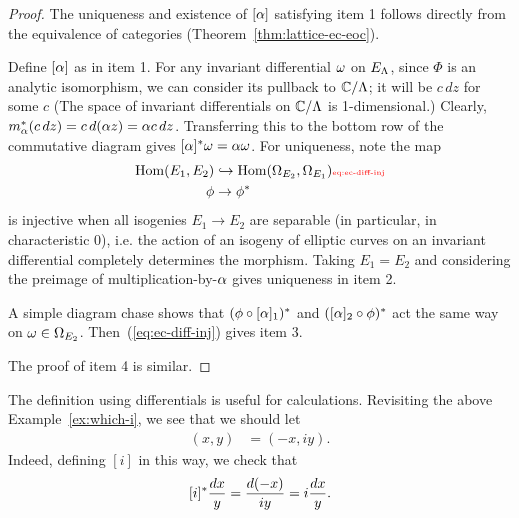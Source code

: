 \begin{proof}
The uniqueness and existence of $[\alpha]$ satisfying item 1 follows directly from the equivalence of categories (Theorem~\ref{thm:lattice-ec-eoc}).

Define $[\alpha]$ as in item 1.
For any invariant differential $\omega$ on $E_{\Lambda}$, since $\Phi$ is an analytic isomorphism, we can consider its pullback to $\mathbb{C}/\Lambda$; it will be $c\,dz$ for some $c$ (The space of invariant differentials on $\mathbb{C}/\Lambda$ is 1-dimensional.) Clearly, $m_{\alpha}^*(c\,dz)=c\,d(\alpha z)=\alpha c\,dz$. Transferring this to the bottom row of the commutative diagram gives $[\alpha]^*\omega=\alpha\omega$. 
For uniqueness, note the map
\begin{align}
\Hom(E_1,E_2)&\hra \Hom(\Om_{E_2},\Om_{E_1})\llabel{eq:ec-diff-inj}
\\
\nonumber\phi&\to \phi^*
\end{align}
is injective when all isogenies $E_1\to E_2$ are separable (in particular, in characteristic 0), i.e. the action of an isogeny of elliptic curves on an invariant differential completely determines the morphism. Taking $E_1=E_2$ and considering the preimage of multiplication-by-$\alpha$ gives uniqueness in item 2.

A simple diagram chase shows that $(\phi \circ [\alpha]_1)^*$ and $([\alpha]_2\circ \phi)^*$ act the same way on $\omega\in \Omega_{E_2}$. Then~(\ref{eq:ec-diff-inj}) gives item 3.

The proof of item 4 is similar.
\end{proof}
\begin{ex}
The definition using differentials is useful for calculations. 
Revisiting the above Example~\ref{ex:which-i}, we see that we should let
\begin{align*}
[i](x,y)&=(-x,iy).
\end{align*}
Indeed, defining $[i]$ in this way, we check that
\[
[i]^*\frac{dx}{y}=\frac{d(-x)}{iy}=i\frac{dx}{y}.
\]
\end{ex}
